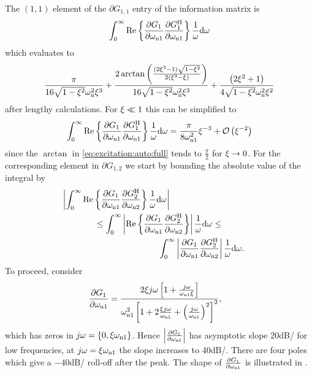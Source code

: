 The $(1,1)$ element of the $\partial G_{1,1}$ entry of the information matrix is
\begin{align}
  \int_0^\infty\RealPart\left\{\frac{\partial G_1}{\partial \wn[1]}\frac{\partial G_1^{\HT}}{\partial \wn[1]}\right\}\frac{1}{\omega}\dd\omega
\end{align}
which evaluates to
\begin{equation}
\frac{\pi }
          {16  \sqrt{1 - \damping^2}\wn^{2} \damping^{3}} 
+ 
\frac{ 2\arctan  
                               \left(
                                       \frac{(2  \damping^{2} - 1) \sqrt{1-\damping^{2}}}
                                                {2  (\damping^{3} - \damping)}
                              \right)}
         {16  \sqrt{1-\damping^{2}} \wn^{2}  \damping^{3}}
+
\frac{{\left(2  \damping^{2} + 1 \right)} }
         {4  \sqrt{1-\damping^{2}} \wn^{2} \damping^{2}}
\label{eq:excitation:auto:full}
\end{equation}
after lengthy calculations.
For $\damping \ll 1$ this can be simplified to
\begin{equation}
\label{eq:excitation:auto}
\int_0^\infty\RealPart\left\{\frac{\partial G_1}{\partial \wn[1]}\frac{\partial G_1^{\HT}}{\partial \wn[1]}\right\}\frac{1}{\omega}\dd\omega
 = 
 \frac{\pi}
          {8\wn[1]^2}\damping^{-3} 
+ \bigO{\damping^{-2}}
\end{equation}
since the $\arctan$ in \eqref{eq:excitation:auto:full} tends to $\frac{\pi}{2}$ for $\damping \to 0$.
For the corresponding element in $\partial G_{1,2}$ we start by bounding the absolute value of the integral by
\begin{gather}
\left|\int_0^\infty\RealPart\left\{\frac{\partial G_1}{\partial \wn[1]}\frac{\partial G_2^{\HT}}{\partial \wn[2]}\right\}\frac{1}{\omega}\dd\omega\right|
\qquad \qquad \qquad \qquad \qquad
\label{eq:excitation:cross1} \\
\leq
\int_0^\infty\left|\RealPart\left\{\frac{\partial G_1}{\partial \wn[1]}\frac{\partial G_2^{\HT}}{\partial \wn[2]}\right\}\right|\frac{1}{\omega}\dd\omega
\leq \\
\qquad \qquad \qquad \qquad \qquad
\int_0^\infty\left|\frac{\partial G_1}{\partial \wn[1]}\frac{\partial G_2^{\HT}}{\partial \wn[2]}\right|\frac{1}{\omega}\dd\omega \text{.}\label{eq:excitation:cross}
\end{gather}
To proceed, consider
\begin{align}
\frac{\partial G_1}{\partial \wn[1]} 
  &= \frac{2\damping j\omega\left[1+\frac{j\omega}{\wn[1]\damping}\right]}
  {\wn[1]^2\left[1+2\frac{\damping j\omega}{\wn[1]} + \left(\frac{j\omega}{\wn[1]}\right)^2\right]^2},
\end{align}
which has zeros in $j\omega=\left\{0, \damping\wn[1]\right\}$. 
Hence $\left|\frac{\partial G_1}{\partial \wn[1]} \right|$ has asymptotic slope 20\unit{dB/\decade} for low frequencies, at $j\omega=\damping\wn[1]$ the slope increases to 40\unit{dB/\decade}. 
There are four poles which give a $-40$\unit{dB/\decade} roll-off after the peak. 
The shape of $\frac{\partial G_1}{\partial \wn[1]} $ is illustrated in .

